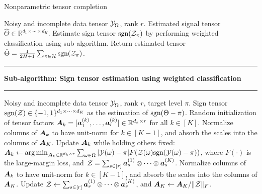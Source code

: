 \documentclass[10pt]{article}
\def\sign{\textup{sgn}}
\newcommand\Algphase[1]{%
\vspace*{-.7\baselineskip}\Statex\hspace*{\dimexpr-\algorithmicindent-2pt\relax}\rule{\textwidth}{0.4pt}%
\Statex\hspace*{-\algorithmicindent}\textbf{#1}%
\vspace*{-.7\baselineskip}\Statex\hspace*{\dimexpr-\algorithmicindent-2pt\relax}\rule{\textwidth}{0.4pt}%
}
\begin{document}
\begin{algorithm}
  \caption{Nonparametric tensor completion}\label{alg:tensorT}
 \begin{algorithmic}[1] 
\INPUT  Noisy and incomplete data tensor $\mathcal{Y}_\Omega$, rank $r$.
\OUTPUT Estimated signal tensor $\hat \Theta\in\mathbb{R}^{d_1\times \cdots \times d_K}$.
\State Estimate sign tensor $\sign(\tZ_\pi)$ by performing weighted classification using sub-algorithm.
\EndFor
\State Return estimated tensor $\hat \Theta={1\over 2H+1}\sum_{\pi \in \tH}\sign(\tZ_\pi)$.
\vspace{.1cm}
\Algphase{Sub-algorithm: Sign tensor estimation using weighted classification}
\INPUT  Noisy and incomplete data tensor $\mathcal{Y}_\Omega$, rank $r$, target level $\pi$.
\OUTPUT Sign tensor $\sign(\tZ) \in\{-1,1\}^{d_1\times \cdots \times d_K}$ as the estimation of $\sign(\Theta-\pi)$. 
\State Random initialization of tensor factors $\bm A_k=[\bm{a}^{(k)}_1,\ldots,\bm{a}^{(k)}_r]\in\mathbb{R}^{d_k\times r}$ for all $k\in[K]$. 
\State Normalize columns of $\bm A_k$ to have unit-norm for $k\in[K-1]$, and absorb the scales into the columns of $\bm A_K$. 
\State Update $\bm A_k$ while holding others fixed: $\mA_k\leftarrow \argmin_{\mA_k\in\mathbb{R}^{d_k\times r}}\sum_{\omega\in \Omega} |\tY(\omega)-\pi|F(\tZ(\omega)\sign(\tY(\omega)-\pi))$, where $F(\cdot)$ is the large-margin loss, and $\mathcal{Z}=\sum_{s\in[r]} \bm{a}^{(1)}_s\otimes \cdots\otimes \bm{a}^{(K)}_s$. 
\EndFor
\State Normalize columns of $\bm A_k$ to have unit-norm for $k\in[K-1]$, and absorb the scales into the columns of $\bm A_K$. 
\State Update $\mathcal{Z}\leftarrow \sum_{s\in[r]} \bm{a}^{(1)}_s\otimes \cdots\otimes \bm{a}^{(K)}_s$, and $\bm A_K\leftarrow \bm A_K/\lVert\mathcal{Z}\rVert_F$.
\EndWhile
    \end{algorithmic}
\end{algorithm}
\end{document}
